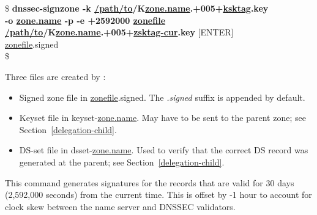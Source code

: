 \begin{tabbing}
\hspace{0.5in}\$ {\bf dnssec-signzone -k \underline{/path/to}/K\underline{zone.name}.+005+\underline{ksktag}.key} \\
\hspace{0.5in} {\bf -o \underline{zone.name} -p -e +2592000 \underline{zonefile}} \\
\hspace{0.5in} {\bf \underline{/path/to}/K\underline{zone.name}.+005+\underline{zsktag-cur}.key} $[$ENTER$]$ \\
\hspace{0.5in} \underline{zonefile}.signed \\
\hspace{0.5in}\$ \\
\end{tabbing}

Three files are created by :
\begin{itemize}
\item Signed zone file in \underline{zonefile}.signed.
The {\it .signed} suffix is appended by default.

\item Keyset file in keyset-\underline{zone.name}.
May have to be sent to the parent zone; see Section~\ref{delegation-child}.

\item DS-set file in dsset-\underline{zone.name}.
Used to verify that the correct DS record was generated at the parent;
see Section~\ref{delegation-child}.

\end{itemize}

This  command generates signatures for the records that
are valid for 30 days (2,592,000 seconds) from the current time.  This
is offset by -1 hour to account for clock skew between the name server and
DNSSEC validators.





\label{signzone-nodel-last}

